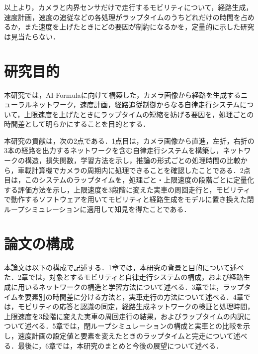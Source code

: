 以上より，カメラと内界センサだけで走行するモビリティについて，経路生成，速度計画，速度の追従などの各処理がラップタイムのうちどれだけの時間を占めるか，また速度を上げたときにどの要因が制約になるかを，定量的に示した研究は見当たらない．

\section{研究目的}
\label{sec:purpose}
本研究では，AI-Formulaに向けて構築した，カメラ画像から経路を生成するニューラルネットワーク，速度計画，経路追従制御からなる自律走行システムについて，上限速度を上げたときにラップタイムの短縮を妨げる要因を，処理ごとの時間差として明らかにすることを目的とする．

本研究の貢献は，次の2点である．1点目は，カメラ画像から直進，左折，右折の3本の経路を出力するネットワークを含む自律走行システムを構築し，ネットワークの構造，損失関数，学習方法を示し，推論の形式ごとの処理時間の比較から，車載計算機でカメラの周期内に処理できることを確認したことである．2点目は，このシステムのラップタイムを，処理ごと・上限速度の段階ごとに定量化する評価方法を示し，上限速度を3段階に変えた実車の周回走行と，モビリティで動作するソフトウェアを用いてモビリティと経路生成をモデルに置き換えた閉ループシミュレーションに適用して知見を得たことである．

\section{論文の構成}
\label{sec:organization}
本論文は以下の構成で記述する．1章では，本研究の背景と目的について述べた．2章では，対象とするモビリティと自律走行システムの構成，および経路生成に用いるネットワークの構造と学習方法について述べる．3章では，ラップタイムを要素別の時間差に分ける方法と，実車走行の方法について述べる．4章では，モビリティの応答と認識の同定，経路生成ネットワークの検証と処理時間，上限速度を3段階に変えた実車の周回走行の結果，およびラップタイムの内訳について述べる．5章では，閉ループシミュレーションの構成と実車との比較を示し，速度計画の設定値と要素を変えたときのラップタイムと完走について述べる．最後に，6章では，本研究のまとめと今後の展望について述べる．
